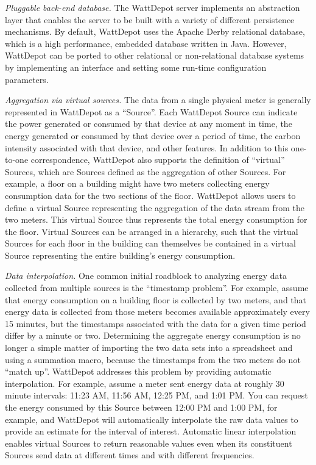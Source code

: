 {\em Pluggable back-end database.} The WattDepot server implements an
abstraction layer that enables the server to be built with a variety of
different persistence mechanisms.  By default, WattDepot uses the Apache
Derby relational database, which is a high performance, embedded database
written in Java.  However, WattDepot can be ported to other relational or
non-relational database systems by implementing an interface and setting some 
run-time configuration parameters. 

{\em Aggregation via virtual sources.} The data from a single physical
meter is generally represented in WattDepot as a ``Source''.  Each
WattDepot Source can indicate the power generated or consumed by that
device at any moment in time, the energy generated or consumed by that
device over a period of time, the carbon intensity associated with that
device, and other features.  In addition to this one-to-one correspondence,
WattDepot also supports the definition of ``virtual'' Sources, which are
Sources defined as the aggregation of other Sources.  For example, a floor
on a building might have two meters collecting energy consumption data for
the two sections of the floor.  WattDepot allows users to
define a virtual Source representing the aggregation of the data stream
from the two meters.  This virtual Source thus represents the total energy
consumption for the floor. Virtual Sources can be arranged in a hierarchy,
such that the virtual Sources for each floor in the building can themselves
be contained in a virtual Source representing the entire building's energy
consumption.

{\em Data interpolation.} One common initial roadblock to analyzing energy
data collected from multiple sources is the ``timestamp problem''. For
example, assume that energy consumption on a building floor is collected by
two meters, and that energy data is collected from those meters becomes
available approximately every 15 minutes, but the timestamps associated
with the data for a given time period differ by a minute or two.
Determining the aggregate energy consumption is no longer a simple matter
of importing the two data sets into a spreadsheet and using a summation
macro, because the timestamps from the two meters do not ``match up''.
WattDepot addresses this problem by providing automatic interpolation. For
example, assume a meter sent energy data at roughly 30 minute intervals:
11:23 AM, 11:56 AM, 12:25 PM, and 1:01 PM.  You can request the energy consumed
by this Source between 12:00 PM and 1:00 PM, for example, and WattDepot will
automatically interpolate the raw data values to provide an estimate for
the interval of interest.  Automatic linear interpolation enables virtual Sources
to return reasonable values even when its constituent Sources send data at
different times and with different frequencies. 

